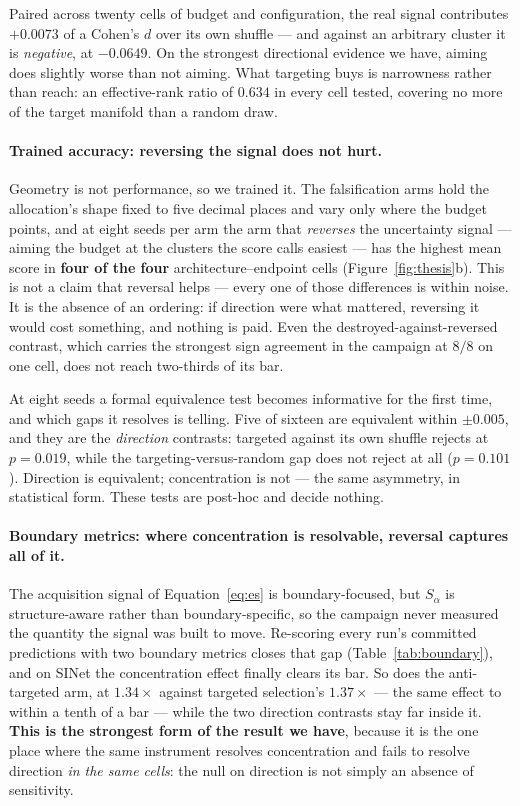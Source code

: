 \documentclass{article} %
\begin{document}
Paired across twenty cells of budget and configuration, the real signal contributes $+0.0073$ of a
Cohen's $d$ over its own shuffle --- and against an arbitrary cluster it is \emph{negative}, at
$-0.0649$. On the strongest directional evidence we have, aiming does slightly worse than not
aiming. What targeting buys is narrowness rather than reach: an effective-rank ratio of $0.634$ in
every cell tested, covering no more of the target manifold than a random draw.

\paragraph{Trained accuracy: reversing the signal does not hurt.} Geometry is not performance, so we
trained it. The falsification arms hold the allocation's shape fixed to five decimal places and vary
only where the budget points, and at eight seeds per arm the arm that \emph{reverses} the
uncertainty signal --- aiming the budget at the clusters the score calls easiest --- has the highest
mean score in \textbf{four of the four} architecture--endpoint cells (Figure~\ref{fig:thesis}b).
This is not a claim that reversal helps --- every one of those differences is within noise. It is
the absence of an ordering: if direction were what mattered, reversing it would cost something, and
nothing is paid. Even the destroyed-against-reversed contrast, which carries the strongest sign
agreement in the campaign at $8/8$ on one cell, does not reach two-thirds of its bar.

At eight seeds a formal equivalence test becomes informative for the first time, and which gaps it
resolves is telling. Five of sixteen are equivalent within $\pm 0.005$, and they are the
\emph{direction} contrasts: targeted against its own shuffle rejects at $p = 0.019$, while the
targeting-versus-random gap does not reject at all ($p = 0.101$). Direction is equivalent;
concentration is not --- the same asymmetry, in statistical form. These tests are post-hoc and
decide nothing.

\paragraph{Boundary metrics: where concentration is resolvable, reversal captures all of it.} The
acquisition signal of Equation~\ref{eq:es} is boundary-focused, but $S_\alpha$ is structure-aware
rather than boundary-specific, so the campaign never measured the quantity the signal was built to
move. Re-scoring every run's committed predictions with two boundary metrics closes that gap
(Table~\ref{tab:boundary}), and on SINet the concentration effect finally clears its bar. So does
the anti-targeted arm, at $1.34\times$ against targeted selection's $1.37\times$ --- the same effect
to within a tenth of a bar --- while the two direction contrasts stay far inside it.
\textbf{This is the strongest form of the result we have}, because it is the one place where the
same instrument resolves concentration and fails to resolve direction \emph{in the same cells}: the
null on direction is not simply an absence of sensitivity.
\end{document}

